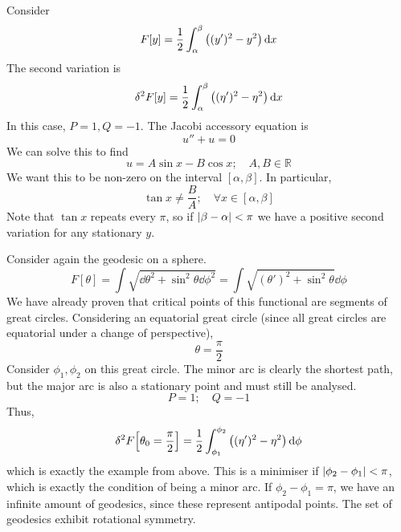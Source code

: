 \begin{example}
	Consider
	\[
		F[y] = \frac{1}{2} \int_\alpha^\beta \qty( (y')^2 - y^2 ) \dd{x}
	\]
	The second variation is
	\[
		\delta^2 F[y] = \frac{1}{2} \int_\alpha^\beta \qty( (\eta')^2 - \eta^2 ) \dd{x}
	\]
	In this case, \( P = 1, Q = -1 \).
	The Jacobi accessory equation is
	\[
		u'' + u = 0
	\]
	We can solve this to find
	\[
		u = A \sin x - B \cos x;\quad A,B \in \mathbb R
	\]
	We want this to be non-zero on the interval \( [\alpha, \beta] \).
	In particular,
	\[
		\tan x \neq \frac{B}{A};\quad \forall x \in [\alpha, \beta]
	\]
	Note that \( \tan x \) repeats every \( \pi \), so if \( \abs{\beta - \alpha} < \pi \) we have a positive second variation for any stationary \( y \).
\end{example}

\begin{example}
	Consider again the geodesic on a sphere.
	\[
		F[\theta] = \int \sqrt{\dd{\theta}^2 + \sin^2\theta \dd{\phi}^2} = \int \sqrt{(\theta')^2 + \sin^2\theta}\dd{\phi}
	\]
	We have already proven that critical points of this functional are segments of great circles.
	Considering an equatorial great circle (since all great circles are equatorial under a change of perspective),
	\[
		\theta = \frac{\pi}{2}
	\]
	Consider \( \phi_1, \phi_2 \) on this great circle.
	The minor arc is clearly the shortest path, but the major arc is also a stationary point and must still be analysed.
	\[
		P = 1;\quad Q = -1
	\]
	Thus,
	\[
		\delta^2 F\qty[\theta_0 = \frac{\pi}{2}] = \frac{1}{2} \int_{\phi_1}^{\phi_2} \qty((\eta')^2 - \eta^2) \dd{\phi}
	\]
	which is exactly the example from above.
	This is a minimiser if \( \abs{\phi_2 - \phi_1} < \pi \), which is exactly the condition of being a minor arc.
	If \( \phi_2 - \phi_1 = \pi \), we have an infinite amount of geodesics, since these represent antipodal points.
	The set of geodesics exhibit rotational symmetry.
\end{example}
